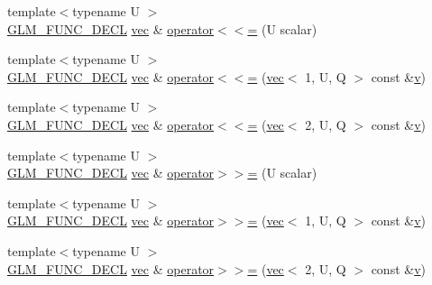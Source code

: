 \begin{DoxyCompactItemize}
\item 
{\footnotesize template$<$typename U $>$ }\\\mbox{\hyperlink{setup_8hpp_ab2d052de21a70539923e9bcbf6e83a51}{G\+L\+M\+\_\+\+F\+U\+N\+C\+\_\+\+D\+E\+CL}} \mbox{\hyperlink{structglm_1_1vec}{vec}} \& \mbox{\hyperlink{structglm_1_1vec_3_012_00_01_t_00_01_q_01_4_ad7b07e1346a5e808343241891129d11e}{operator$<$$<$=}} (U scalar)
\item 
{\footnotesize template$<$typename U $>$ }\\\mbox{\hyperlink{setup_8hpp_ab2d052de21a70539923e9bcbf6e83a51}{G\+L\+M\+\_\+\+F\+U\+N\+C\+\_\+\+D\+E\+CL}} \mbox{\hyperlink{structglm_1_1vec}{vec}} \& \mbox{\hyperlink{structglm_1_1vec_3_012_00_01_t_00_01_q_01_4_a8ab9f3c08e3bcd5376f5852b15069a43}{operator$<$$<$=}} (\mbox{\hyperlink{structglm_1_1vec}{vec}}$<$ 1, U, Q $>$ const \&\mbox{\hyperlink{_s_d_l__opengl_8h_a10a82eabcb59d2fcd74acee063775f90}{v}})
\item 
{\footnotesize template$<$typename U $>$ }\\\mbox{\hyperlink{setup_8hpp_ab2d052de21a70539923e9bcbf6e83a51}{G\+L\+M\+\_\+\+F\+U\+N\+C\+\_\+\+D\+E\+CL}} \mbox{\hyperlink{structglm_1_1vec}{vec}} \& \mbox{\hyperlink{structglm_1_1vec_3_012_00_01_t_00_01_q_01_4_a6ddb083ba5a5c11f378fb85c8842cc9c}{operator$<$$<$=}} (\mbox{\hyperlink{structglm_1_1vec}{vec}}$<$ 2, U, Q $>$ const \&\mbox{\hyperlink{_s_d_l__opengl_8h_a10a82eabcb59d2fcd74acee063775f90}{v}})
\item 
{\footnotesize template$<$typename U $>$ }\\\mbox{\hyperlink{setup_8hpp_ab2d052de21a70539923e9bcbf6e83a51}{G\+L\+M\+\_\+\+F\+U\+N\+C\+\_\+\+D\+E\+CL}} \mbox{\hyperlink{structglm_1_1vec}{vec}} \& \mbox{\hyperlink{structglm_1_1vec_3_012_00_01_t_00_01_q_01_4_a5cda1333155cc198e688a415467f93be}{operator$>$$>$=}} (U scalar)
\item 
{\footnotesize template$<$typename U $>$ }\\\mbox{\hyperlink{setup_8hpp_ab2d052de21a70539923e9bcbf6e83a51}{G\+L\+M\+\_\+\+F\+U\+N\+C\+\_\+\+D\+E\+CL}} \mbox{\hyperlink{structglm_1_1vec}{vec}} \& \mbox{\hyperlink{structglm_1_1vec_3_012_00_01_t_00_01_q_01_4_a6f9dfd8f7093aad6a2d57e830a990016}{operator$>$$>$=}} (\mbox{\hyperlink{structglm_1_1vec}{vec}}$<$ 1, U, Q $>$ const \&\mbox{\hyperlink{_s_d_l__opengl_8h_a10a82eabcb59d2fcd74acee063775f90}{v}})
\item 
{\footnotesize template$<$typename U $>$ }\\\mbox{\hyperlink{setup_8hpp_ab2d052de21a70539923e9bcbf6e83a51}{G\+L\+M\+\_\+\+F\+U\+N\+C\+\_\+\+D\+E\+CL}} \mbox{\hyperlink{structglm_1_1vec}{vec}} \& \mbox{\hyperlink{structglm_1_1vec_3_012_00_01_t_00_01_q_01_4_a39d690e7942ded7dbff157a33236b797}{operator$>$$>$=}} (\mbox{\hyperlink{structglm_1_1vec}{vec}}$<$ 2, U, Q $>$ const \&\mbox{\hyperlink{_s_d_l__opengl_8h_a10a82eabcb59d2fcd74acee063775f90}{v}})

\end{DoxyCompactItemize}
